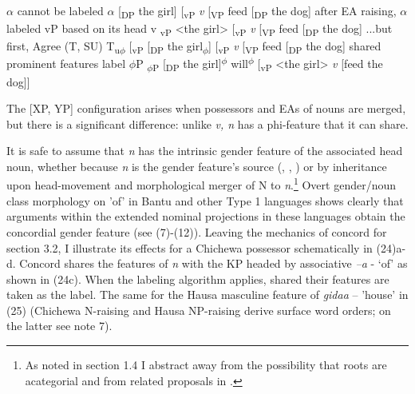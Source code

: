 \documentclass[output=paper
,modfonts
,nonflat]{langsci/langscibook}
\begin{document}
\begin{exe}
\xlist
	\ex $\alpha$ cannot be labeled\newline
	{\lbrack}$\alpha$ [\textsubscript{DP} the girl] [\textsubscript{vP} \textit{v} [\textsubscript{VP} feed [\textsubscript{DP} the dog]{\rbrack} 
	\ex after EA raising, $\alpha$ labeled vP based on its head v\newline
	{\lbrack}\textsubscript{vP} {\textless}the girl{\textgreater} [\textsubscript{vP} \textit{v} [\textsubscript{VP} feed [\textsubscript{DP} the dog]{\rbrack} 
	\ex ...but first, Agree (T, SU)\newline
	{\lbrack}T\textsubscript{u$\phi$} [\textsubscript{vP} [\textsubscript{DP} the girl\textsubscript{$\phi$}] [\textsubscript{vP} \textit{v} [\textsubscript{VP} feed [\textsubscript{DP} the dog]{\rbrack} 
		\ex shared prominent features label $\phi$P\newline
	{\lbrack}\textsubscript{$\phi$P} [\textsubscript{DP} the girl]\textsuperscript{$\phi$} will\textsuperscript{$\phi$} [\textsubscript{vP} <the girl> \textit{v} [feed the dog]]{\rbrack}  
\endxlist
\end{exe}
The [XP, YP] configuration arises when possessors and EAs of nouns are merged, but there is a significant difference: unlike \textit{v, n} has a phi-feature that it can share. 

It is safe to assume that \textit{n} has the intrinsic gender feature of the associated head noun, whether because \textit{n} is the gender feature's source (\citealt{Kramer2015}, \citealt{Kihm2005}, \citealt{Lecarme2002}) or by inheritance upon head-movement and morphological merger of N to \textit{n}.\footnote{As noted in section 1.4 I abstract away from the possibility that roots are acategorial and from related proposals in \citet{Chomsky2015}.} Overt gender/noun class morphology on 'of' in Bantu and other Type 1 languages shows clearly that arguments within the extended nominal projections in these languages obtain the concordial gender feature (see (7)-(12)). Leaving the mechanics of concord for section 3.2, I illustrate its effects for a Chichewa possessor schematically in (24)a-d. Concord shares the features of \textit{n} with the KP headed by associative \textit{–a} - ‘of’ as shown in (24c). When the labeling algorithm applies, shared their features are taken as the label. The same for the Hausa masculine feature of \textit{gidaa} – 'house' in (25) (Chichewa N-raising and Hausa NP-raising derive surface word orders; on the latter see note 7). 
\end{document}
